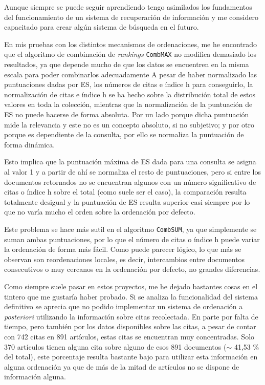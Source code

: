 Aunque siempre se puede seguir aprendiendo tengo asimilados los fundamentos del funcionamiento de un sistema de recuperación de información y me considero capacitado para crear algún sistema de búsqueda en el futuro.

En mis pruebas con los distintos mecanismos de ordenaciones, me he encontrado que el algoritmo de combinación de \textit{rankings} \texttt{CombMAX} no modifica demasiado los resultados, ya que depende mucho de que los datos se encuentren en la misma escala para poder combinarlos adecuadamente A pesar de haber normalizado las puntuaciones dadas por \acrshort{ES}, los números de citas e índice h para conseguirlo, la normalización de citas e índice h se ha hecho sobre la distribución total de estos valores en toda la colección, mientras que la normalización de la puntuación de \acrshort{ES} no puede hacerse de forma absoluta. Por un lado porque dicha puntuación mide la relevancia y este no es un concepto absoluto, si no subjetivo; y por otro porque es dependiente de la consulta, por ello se normaliza la puntuación de forma dinámica.

Esto implica que la puntuación máxima de \acrshort{ES} dada para una consulta se asigna al valor 1 y a partir de ahí se normaliza el resto de puntuaciones, pero si entre los documentos retornados no se encuentran algunos con un número significativo de citas o índice h sobre el total (como suele ser el caso), la comparación resulta totalmente desigual y la puntuación de \acrshort{ES} resulta superior casi siempre por lo que no varía mucho el orden sobre la ordenación por defecto.

Este problema se hace más sutil en el algoritmo \texttt{CombSUM}, ya que simplemente se suman ambas puntuaciones, por lo que el número de citas o índice h puede variar la ordenación de forma más fácil. Como puede parecer lógico, lo que más se observan son reordenaciones locales, es decir, intercambios entre documentos consecutivos o muy cercanos en la ordenación por defecto, no grandes diferencias.

Como siempre suele pasar en estos proyectos, me he dejado bastantes cosas en el tintero que me gustaría haber probado. Si se analiza la funcionalidad del sistema definitivo se aprecia que no podido implementar un sistema de ordenación a \textit{posteriori} utilizando la información sobre citas recolectada. En parte por falta de tiempo, pero también por los datos disponibles sobre las citas, a pesar de contar con 742 citas en 891 artículos, estas citas se encuentran muy concentradas. Solo 370 artículos tienen alguna cita sobre alguno de esos 891 documentos ($\sim$ 41,53 \% del total), este porcentaje resulta bastante bajo para utilizar esta información en alguna ordenación ya que de más de la mitad de artículos no se dispone de información alguna.


